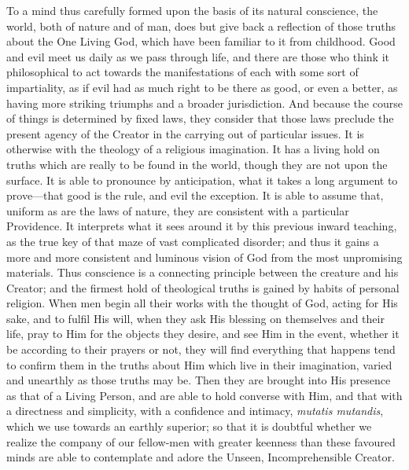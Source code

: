 To a mind thus carefully formed upon the basis of its natural
conscience, the world, both of nature and of man, does but give back a
reflection of those truths about the One Living God, which have been
familiar to it from childhood. Good and evil meet us daily as we pass
through life, and there are those who think it philosophical to act
towards the manifestations of each with some sort of impartiality,
as if evil had as much right to be there as good, or even a
better, as having more striking triumphs and a broader jurisdiction.
And because the course of things is determined by fixed laws, they
consider that those laws preclude the present agency of the Creator in
the carrying out of particular issues. It is otherwise with the
theology of a religious imagination. It has a living hold on truths
which are really to be found in the world, though they are not upon
the surface. It is able to pronounce by anticipation, what it takes a
long argument to prove—that good is the rule, and evil the
exception. It is able to assume that, uniform as are the laws of
nature, they are consistent with a particular Providence. It
interprets what it sees around it by this previous inward teaching, as
the true key of that maze of vast complicated disorder; and thus it
gains a more and more consistent and luminous vision of God from the
most unpromising materials. Thus conscience is a connecting principle
between the creature and his Creator; and the firmest hold of
theological truths is gained by habits of personal religion. When men
begin all their works with the thought of God, acting for His sake,
and to fulfil His will, when they ask His blessing on themselves and
their life, pray to Him for the objects they desire, and see Him in
the event, whether it be according to their prayers or not, they will
find everything that happens tend to confirm them in the truths about
Him which live in their imagination, varied and unearthly as those
truths may be. Then they are brought into His presence as that of a
Living Person, and are able to hold converse with Him, and that
with a directness and simplicity, with a confidence and intimacy, \emph{mutatis
mutandis}, which we use towards an earthly superior; so that it is
doubtful whether we realize the company of our fellow-men with greater
keenness than these favoured minds are able to contemplate and adore
the Unseen, Incomprehensible Creator.

